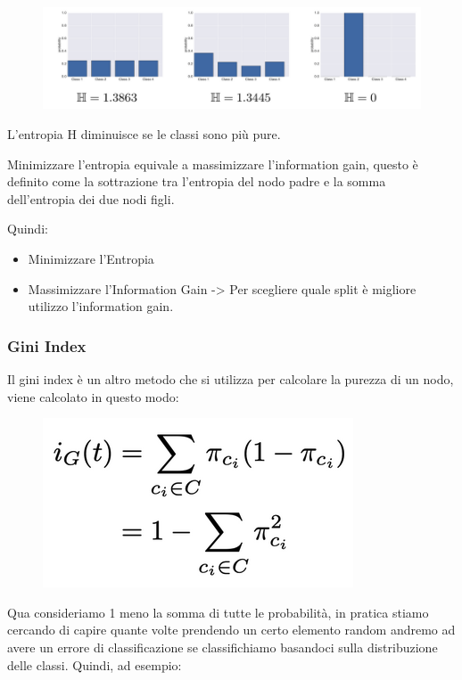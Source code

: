 \documentclass[14pt]{extreport}
\begin{document}
\begin{figure}[H]
	\centering
	\includegraphics[width=0.7\linewidth]{587.jpeg}
\end{figure}

L’entropia H diminuisce se le classi sono più pure.

Minimizzare l’entropia equivale a massimizzare l’information gain, questo è definito come la sottrazione tra l’entropia del nodo padre e la somma
dell’entropia dei due nodi figli.

Quindi:
\begin{itemize}
	\item Minimizzare l’Entropia
	\item Massimizzare l’Information Gain -> Per scegliere quale split è migliore utilizzo l’information gain.
\end{itemize}



\subsubsection{Gini Index}


Il gini index è un altro metodo che si utilizza per calcolare la purezza di un nodo, viene calcolato in questo modo:

\begin{figure}[H]
	\centering
	\includegraphics[width=0.7\linewidth]{588.jpeg}
\end{figure}

Qua consideriamo 1 meno la somma di tutte le probabilità, in pratica stiamo cercando di capire quante volte prendendo un certo elemento random andremo
ad avere un errore di classificazione se classifichiamo basandoci sulla distribuzione delle classi. Quindi, ad esempio:
\end{document}
